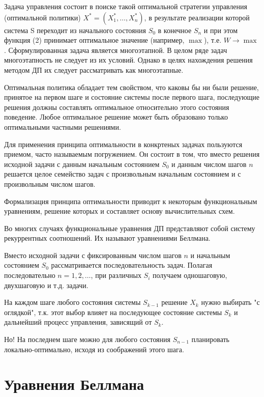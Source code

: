 \documentclass[17pt]{extarticle}
\begin{document}
Задача управления состоит в поиске такой оптимальной стратегии
управления (оптимальной политики) $X^*=(X_1^*, \dots, X_n^*)$, в результате
реализации которой система S переходит из начального состояния $S_0$
в конечное $S_n$ и при этом функция (2) принимает оптимальное
значение (например, $\max$), т.е. $W \rightarrow \max$.
Сформулированная задача является многоэтапной. В целом ряде
задач многоэтапность не следует из их условий. Однако в целях
нахождения решения методом ДП их следует рассматривать как
многоэтапные.
\begin{theorem}
    Оптимальная политика обладает тем свойством, что каковы бы ни были решение, принятое на первом шаге и состояние системы после первого шага,
    последующие решения должны составлять оптимальное относительно этого состояния поведение.
    Любое оптимальное решение может быть образовано только оптимальными частными решениями.
\end{theorem}
Для применения принципа оптимальности в конкртеных задачах пользуются приемом, часто называемым погружением.
Он состоит в том, что вместо решения исходной задачи с данным начальным состоянием $S_0$ и данным числом шагов $n$ решается
целое семейство задач с произвольным начальным состоянием и с произвольным числом шагов.

Формализация принципа оптимальности приводит к некоторым функциональным уравнениям, решение которых и составляет основу вычислительных схем.

Во многих случаях функциональные уравнения ДП представляют собой систему рекуррентных соотношений. Их называют уравнениями Беллмана.

Вместо исходной задачи с фиксированным числом шагов \( n \) и начальным состоянием \( S_0 \) рассматривается последовательность задач.
Полагая последовательно \( n = 1, 2, \ldots \), при различных \( S_i \) получаем одношаговую, двухшаговую и т.д. задачи.

На каждом шаге любого состояния системы \( S_{k-1} \) решение \( X_k \) нужно выбирать "с оглядкой",
т.к. этот выбор влияет на последующее состояние системы \( S_k \) и дальнейший процесс управления, зависящий от \( S_k \).

Но! На последнем шаге можно для любого состояния \( S_{n-1} \) планировать локально-оптимально, исходя из соображений этого шага.

\section*{Уравнения Беллмана}
\end{document}
